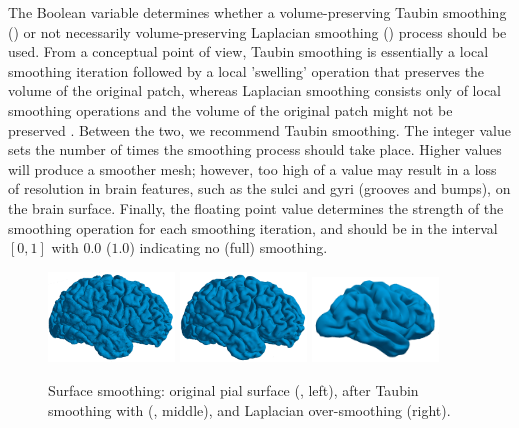 The Boolean variable  determines
whether a volume-preserving Taubin smoothing () or
not necessarily volume-preserving Laplacian smoothing
() process should be used.  From a conceptual
point of view, Taubin smoothing is essentially a local smoothing
iteration followed by a local 'swelling' operation that preserves the
volume of the original patch, whereas Laplacian smoothing consists
only of local smoothing operations and the volume of the original
patch might not be preserved \cite{taubin1995curve}. Between the two, we
recommend Taubin smoothing. The integer value 
sets the number of times the smoothing process should take place. Higher
values will produce a smoother mesh; however, too high of a value may
result in a loss of resolution in brain features, such as the sulci and
gyri (grooves and bumps), on the brain surface. Finally, the floating
point value  determines the strength of the
smoothing operation for each smoothing iteration, and should be in the
interval $[0, 1]$ with $0.0$ ($1.0$) indicating no (full)
smoothing.
\begin{figure}
  \centering
  \includegraphics[width=0.30\textwidth]{./graphics/chp3/unsmoothed.png}
  \includegraphics[width=0.30\textwidth]{./graphics/chp3/taubin-smoothed-10.png}
  \includegraphics[width=0.30\textwidth]{./graphics/chp3/oversmoothing.png}
  \caption{Surface smoothing: original pial surface 
    (, left), after Taubin smoothing with
    {\svmtk} (, middle), and Laplacian over-smoothing (right).}
  \label{fig:chp3:ernie-smoothing}
\end{figure}
%

